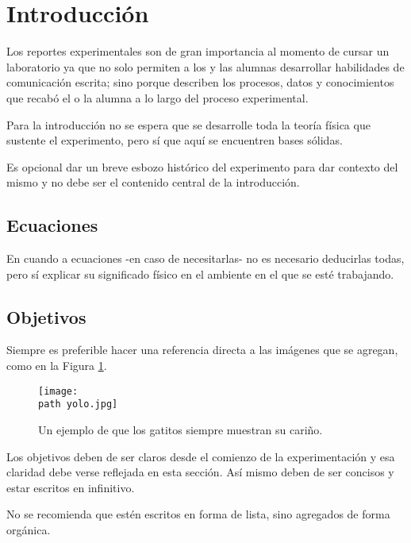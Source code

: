 \section{Introducción}
\label{sec:Intro}

Los reportes experimentales son de gran importancia al momento de cursar un laboratorio ya que no solo permiten a los y las alumnas desarrollar habilidades de comunicación escrita; sino porque describen los procesos, datos y conocimientos que recabó el o la alumna a lo largo del proceso experimental.

Para la introducción no se espera que se desarrolle toda la teoría física que sustente el experimento, pero sí que aquí se encuentren bases sólidas. 

Es opcional dar un breve esbozo histórico del experimento para dar contexto del mismo y no debe ser el contenido central de la introducción.


\subsection{Ecuaciones}
\label{subsec:Ecuaciones}

En cuando a ecuaciones -en caso de necesitarlas- no es necesario deducirlas todas, pero sí explicar su significado físico en el ambiente en el que se esté trabajando.

\subsection{Objetivos}
\label{subsec:Objetivos}

Siempre es preferible hacer una referencia directa a las imágenes que se agregan, como en la Figura \ref{fig:Gatito}.

\begin{figure}[H]
	\centering
	\texttt{[image: \\path yolo.jpg]}
	\caption{Un ejemplo de que los gatitos siempre muestran su cariño.}
	\label{fig:Gatito}
\end{figure}

Los objetivos deben de ser claros desde el comienzo de la experimentación y esa claridad debe verse reflejada en esta sección. Así mismo deben de ser concisos y estar escritos en infinitivo.

No se recomienda que estén escritos en forma de lista, sino agregados de forma orgánica.
